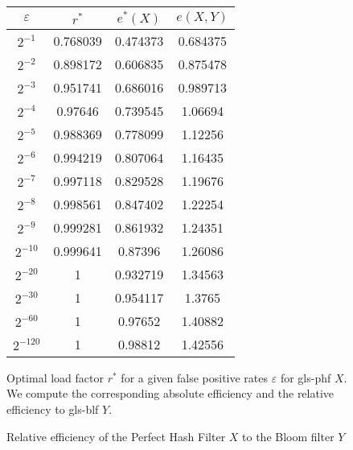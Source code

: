 \documentclass[ ../main.tex]{subfiles}
\begin{document}
\begin{figure}
\centering
\caption{Optimal load factor $r^*$ for a given false positive rates $\varepsilon$ for \gls{gls-phf} $X$. We compute the corresponding absolute efficiency and the relative efficiency to \gls{gls-blf} $Y$.}
\label{fig:abs_eff}
\begin{tabular}{c *{3}{S[table-auto-round,
                 table-format=-1.3]}}
{$\varepsilon$} & {$r^*$} & {$e^*(X)$} & {$e(X,Y)$}\\
\hline
$2^{-1}$  & 0.768039 & 0.474373 & 0.684375\\ 
$2^{-2}$  & 0.898172 & 0.606835 & 0.875478\\
$2^{-3}$  & 0.951741 & 0.686016 & 0.989713\\
$2^{-4}$  & 0.97646 & 0.739545 & 1.06694\\
$2^{-5}$  & 0.988369 & 0.778099 & 1.12256\\
$2^{-6}$  & 0.994219 & 0.807064 & 1.16435\\
$2^{-7}$  & 0.997118 & 0.829528 & 1.19676\\
$2^{-8}$  & 0.998561 & 0.847402 & 1.22254\\
$2^{-9}$  & 0.999281 & 0.861932 & 1.24351\\
$2^{-10}$ & 0.999641 & 0.87396 & 1.26086\\
$2^{-20}$ & 1 & 0.932719 & 1.34563\\
$2^{-30}$ & 1 & 0.954117 & 1.3765\\
$2^{-60}$ & 1 & 0.97652 & 1.40882\\
$2^{-120}$ & 1 & 0.98812 & 1.42556\\
\end{tabular}
\end{figure}

\begin{figure}
\caption{Relative efficiency of the Perfect Hash Filter $X$ to the Bloom filter $Y$}
\label{fig:rel_eff_bf_PHF}
\centering
{}
\end{figure}
\end{document}
